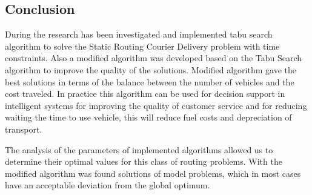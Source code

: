\documentclass[]{TAACpaper}
\begin{document}
 
\subsection{Conclusion}
During the research has been investigated and implemented tabu search algorithm to solve the Static Routing Courier Delivery problem with time constraints. Also a modified algorithm was developed  based on the Tabu Search algorithm to improve the quality of the solutions. Modified algorithm gave the best solutions in terms of the balance between the number of vehicles and the cost traveled.  In practice this algorithm can be used for decision support in intelligent systems for improving the quality of customer service and for reducing waiting the time to use vehicle, this will reduce fuel costs and depreciation of transport.

The analysis of the parameters of implemented algorithms allowed us to determine their optimal values for this class of routing problems. With the modified algorithm was found solutions of model problems, which in most cases have an acceptable deviation from the global optimum.
\end{document}
